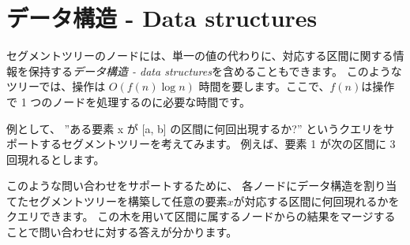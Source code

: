 \section{データ構造 - Data structures}

セグメントツリーのノードには、単一の値の代わりに、対応する区間に関する情報を保持する\emph{データ構造 - data structures}を含めることもできます。
このようなツリーでは、操作は $O(f(n) \log n)$ 時間を要します。ここで、$f(n)$は操作で 1 つのノードを処理するのに必要な時間です。

例として、
''ある要素 x が [a, b] の区間に何回出現するか?''
というクエリをサポートするセグメントツリーを考えてみます。
例えば、要素 1 が次の区間に 3 回現れるとします。
\begin{center}
\end{center}

このような問い合わせをサポートするために、
各ノードにデータ構造を割り当てたセグメントツリーを構築して任意の要素$x$が対応する区間に何回現れるかをクエリできます。
この木を用いて区間に属するノードからの結果をマージすることで問い合わせに対する答えが分かります。

